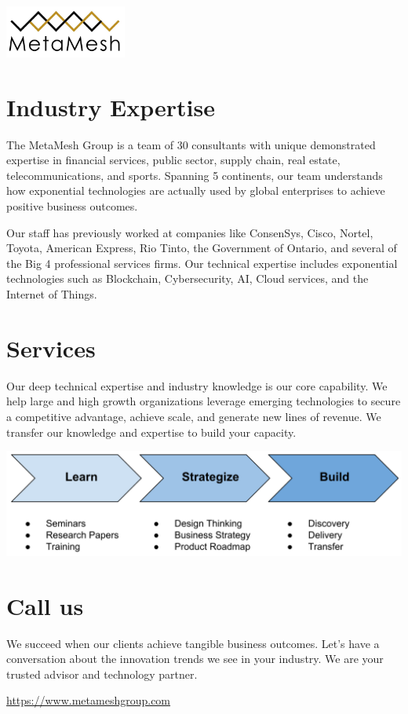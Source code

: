 \documentclass[11pt,letterpaper,roman]{moderncv}        %
\begin{document}
\begin{center}
	\includegraphics[width=4cm]{../pics/logo}
\end{center}
\maketitle
\recomputeletterlengths
\vspace{-1em}
\section{Industry Expertise}
The MetaMesh Group is a team of 30 consultants with unique demonstrated expertise in financial services, public sector, supply chain, real estate, telecommunications, and sports. Spanning 5 continents, our team understands how exponential technologies are actually used by global enterprises to achieve positive business outcomes. 

Our staff has previously worked at companies like ConsenSys, Cisco, Nortel, Toyota, American Express, Rio Tinto, the Government of Ontario, and several of the Big 4 professional services firms. Our technical expertise includes exponential technologies such as Blockchain, Cybersecurity, AI, Cloud services, and the Internet of Things.

\section{Services}
Our deep technical expertise and industry knowledge is our core capability. We help large and high growth organizations leverage emerging technologies to secure a competitive advantage, achieve scale, and generate new lines of revenue. We transfer our knowledge and expertise to build your capacity.

\begin{center}
	\includegraphics[width=14cm]{../pics/3-services}
\end{center}


\section{Call us}
We succeed when our clients achieve tangible business outcomes. Let’s have a conversation about the innovation trends we see in your industry. We are your trusted advisor and technology partner.

\vspace{1em}
\centering
\url{https://www.metameshgroup.com}
\end{document}
